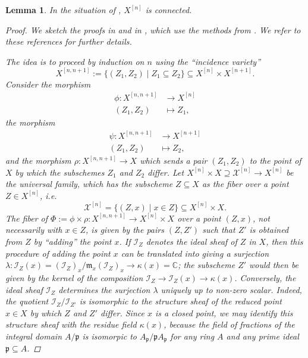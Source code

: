 \documentclass[12pt,a4paper]{amsart}
\theoremstyle{plain}
\newtheorem{lm}[thm]{Lemma}
\theoremstyle{definition}
\theoremstyle{remark}
\begin{document}
\begin{lm}\label{lm:connected}
  In the situation of , $X^{[n]}$ is connected.

  \begin{proof}
    We sketch the proofs in \cite[Example 4.5.10]{hl97} and in \cite[Lemma 3.7]{leh00}, which use the methods from \cite{es98}.
    We refer to these references for further details.

    The idea is to proceed by induction on $n$ using the ``incidence variety''
    \[ X^{[n,n+1]} := \{ (Z_{1}, Z_{2}) \mid Z_{1} \subseteq Z_{2} \} \subseteq X^{[n]} \times X^{[n+1]}. \]
    Consider the morphism
    \begin{align*}
      \phi \colon X^{[n, n+1]} & \longrightarrow X^{[n]} \\
      (Z_{1}, Z_{2}) & \longmapsto Z_{1},
    \end{align*}
    the morphism
    \begin{align*}
      \psi \colon X^{[n, n+1]} & \longrightarrow X^{[n+1]} \\
      (Z_{1}, Z_{2}) & \longmapsto Z_{2},
    \end{align*}
    and the morphism $\rho \colon X^{[n, n+1]} \to X$ which sends a pair $(Z_{1}, Z_{2})$ to the point of $X$ by which the subschemes $Z_{1}$ and $Z_{2}$ differ.
    Let $X^{[n]} \times X \supseteq \mathcal{X}^{[n]} \to X^{[n]}$ be the universal family, which has the subscheme $Z \subseteq X$ as the fiber over a point $Z \in X^{[n]}$, i.e.
    \[ \mathcal{X}^{[n]} = \{ (Z,x) \mid x \in Z \} \subseteq X^{[n]} \times X. \]
    The fiber of $\Phi := \phi \times \rho \colon X^{[n,n+1]} \to X^{[n]} \times X$ over a point $(Z, x)$, not necessarily with $x \in Z$, is given by the pairs $(Z,Z')$ such that $Z'$ is obtained from $Z$ by ``adding'' the point $x$.
    If $\mathscr{I}_{Z}$ denotes the ideal sheaf of $Z$ in $X$, then this procedure of adding the point $x$ can be translated into giving a surjection $\lambda \colon \mathscr{I}_{Z}(x) = (\mathscr{I}_{Z})_{x}/\mathfrak{m}_{x}(\mathscr{I}_{Z})_{x} \to \kappa(x) = \mathbb{C}$; the subscheme $Z'$ would then be given by the kernel of the composition $\mathscr{I}_{Z} \to \mathscr{I}_{Z}(x) \to \kappa(x)$.
    Conversely, the ideal sheaf $\mathscr{I}_{Z}$ determines the surjection $\lambda$ uniquely up to non-zero scalar.
    Indeed, the quotient $\mathscr{I}_{Z}/\mathscr{I}_{Z'}$ is isomorphic to the structure sheaf of the reduced point $x \in X$ by which $Z$ and $Z'$ differ.
    Since $x$ is a closed point, we may identify this structure sheaf with the residue field $\kappa(x)$, because the field of fractions of the integral domain $A/\mathfrak{p}$ is isomorpic to $A_{\mathfrak{p}}/\mathfrak{p}A_{\mathfrak{p}}$ for any ring $A$ and any prime ideal $\mathfrak{p} \subseteq A$.

\end{proof}
\end{lm}
\end{document}

